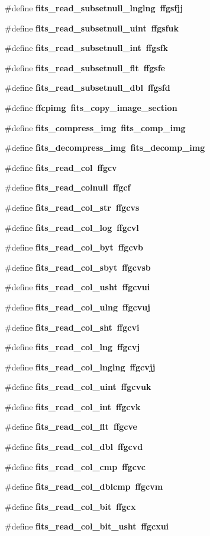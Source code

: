 \begin{CompactItemize}
\item 
\#define \bf{fits\_\-read\_\-subsetnull\_\-lnglng}~ffgsfjj
\item 
\#define \bf{fits\_\-read\_\-subsetnull\_\-uint}~ffgsfuk
\item 
\#define \bf{fits\_\-read\_\-subsetnull\_\-int}~ffgsfk
\item 
\#define \bf{fits\_\-read\_\-subsetnull\_\-flt}~ffgsfe
\item 
\#define \bf{fits\_\-read\_\-subsetnull\_\-dbl}~ffgsfd
\item 
\#define \bf{ffcpimg}~fits\_\-copy\_\-image\_\-section
\item 
\#define \bf{fits\_\-compress\_\-img}~fits\_\-comp\_\-img
\item 
\#define \bf{fits\_\-decompress\_\-img}~fits\_\-decomp\_\-img
\item 
\#define \bf{fits\_\-read\_\-col}~ffgcv
\item 
\#define \bf{fits\_\-read\_\-colnull}~ffgcf
\item 
\#define \bf{fits\_\-read\_\-col\_\-str}~ffgcvs
\item 
\#define \bf{fits\_\-read\_\-col\_\-log}~ffgcvl
\item 
\#define \bf{fits\_\-read\_\-col\_\-byt}~ffgcvb
\item 
\#define \bf{fits\_\-read\_\-col\_\-sbyt}~ffgcvsb
\item 
\#define \bf{fits\_\-read\_\-col\_\-usht}~ffgcvui
\item 
\#define \bf{fits\_\-read\_\-col\_\-ulng}~ffgcvuj
\item 
\#define \bf{fits\_\-read\_\-col\_\-sht}~ffgcvi
\item 
\#define \bf{fits\_\-read\_\-col\_\-lng}~ffgcvj
\item 
\#define \bf{fits\_\-read\_\-col\_\-lnglng}~ffgcvjj
\item 
\#define \bf{fits\_\-read\_\-col\_\-uint}~ffgcvuk
\item 
\#define \bf{fits\_\-read\_\-col\_\-int}~ffgcvk
\item 
\#define \bf{fits\_\-read\_\-col\_\-flt}~ffgcve
\item 
\#define \bf{fits\_\-read\_\-col\_\-dbl}~ffgcvd
\item 
\#define \bf{fits\_\-read\_\-col\_\-cmp}~ffgcvc
\item 
\#define \bf{fits\_\-read\_\-col\_\-dblcmp}~ffgcvm
\item 
\#define \bf{fits\_\-read\_\-col\_\-bit}~ffgcx
\item 
\#define \bf{fits\_\-read\_\-col\_\-bit\_\-usht}~ffgcxui

\end{CompactItemize}
